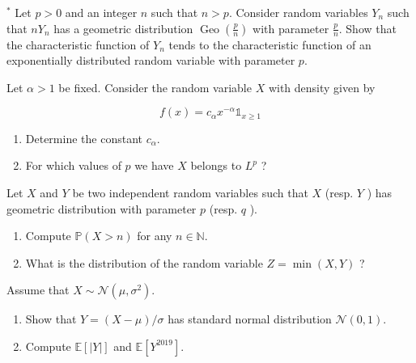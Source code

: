 \documentclass{article}
\begin{document}
\begin{Exercise} ${ }^{*}$ Let $p>0$ and an integer $n$ such that $n>p$. Consider random variables $Y_{n}$ such that $n Y_{n}$ has a geometric distribution $\operatorname{Geo}\left(\frac{p}{n}\right)$ with parameter $\frac{p}{n}$. Show that the characteristic function of $Y_{n}$ tends to the characteristic function of an exponentially distributed random variable with parameter $p$.

\end{Exercise}

\begin{Exercise} Let $\alpha>1$ be fixed. Consider the random variable $X$ with density given by

  $$
    f(x)=c_{\alpha} x^{-\alpha} \mathbb{1}_{x \geq 1}
  $$

  \begin{enumerate}
    \item Determine the constant $c_{\alpha}$.

    \item For which values of $p$ we have $X$ belongs to $L^{p}$ ?

  \end{enumerate}
\end{Exercise}

\begin{Exercise} Let $X$ and $Y$ be two independent random variables such that $X$ (resp. $Y$ ) has geometric distribution with parameter $p$ (resp. $q$ ).
  \begin{enumerate}
    \item Compute $\mathbb{P}(X>n)$ for any $n \in \mathbb{N}$.
    \item What is the distribution of the random variable $Z=\min (X, Y)$ ?
  \end{enumerate}
\end{Exercise}

\begin{Exercise} Assume that $X \sim \mathcal{N}\left(\mu, \sigma^{2}\right)$.
  \begin{enumerate}
    \item Show that $Y=(X-\mu) / \sigma$ has standard normal distribution
          $\mathcal{N}(0,1)$.
    \item Compute $\mathbb{E}[|Y|]$ and $\mathbb{E}\left[Y^{2019}\right]$.
  \end{enumerate}
\end{Exercise}
\end{document}
